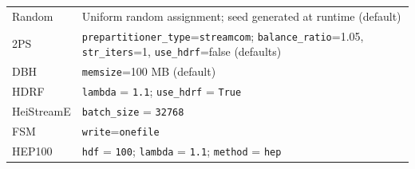 \documentclass[a4paper,10pt]{article}
\begin{document}
\begin{longtable}{@{}>{\raggedright\arraybackslash}p{}>{\raggedright\arraybackslash}p{}@{}}
Random & Uniform random assignment; seed generated at runtime (default) \\
2PS & \texttt{prepartitioner\_type}=\texttt{streamcom}; \texttt{balance\_ratio}=1.05, \texttt{str\_iters}=1, \texttt{use\_hdrf}=false (defaults) \\
DBH & \texttt{memsize}=100 MB (default) \\
HDRF & \texttt{lambda} = \texttt{1.1}; \texttt{use\_hdrf} = \texttt{True} \\
HeiStreamE & \texttt{batch\_size} = \texttt{32768} \\
FSM & \texttt{write}=\texttt{onefile} \\
HEP100 & \texttt{hdf} = \texttt{100}; \texttt{lambda} = \texttt{1.1}; \texttt{method} = \texttt{hep} \\
\end{longtable}
\endgroup
\end{document}
